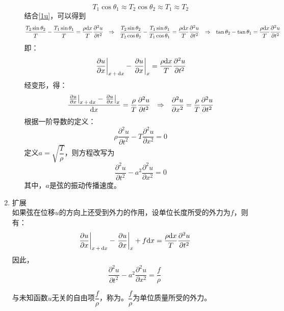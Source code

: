 \begin{enumerate}[\hspace*{3em} 1.]
\begin{enumerate}[]
\begin{equation}
			T_1\cos\theta_1\approx T_2 \cos \theta_2 \approx T_1 \approx T_2
		\end{equation}
		结合\eqref{1u}，可以得到
		\[
		\frac{T_2 \sin \theta_2}{T} - \frac{T_1 \sin\theta_1}{T} = \frac{\rho {\rm{d}} x}{T} \frac{\partial^2 u}{\partial t^2}
		\,\,\,\, \Rightarrow
		\,\,\,\,
		\frac{T_2 \sin \theta_2}{T_2 \cos\theta_2} - \frac{T_1 \sin\theta_1}{T_1\cos\theta_1} = \frac{\rho {\rm{d}} x}{T} \frac{\partial^2 u}{\partial t^2} 
		\,\,\,\, \Rightarrow
		\,\,\,\,
		\tan\theta_2 - \tan\theta_1 = \frac{\rho {\rm{d}} x}{T} \frac{\partial^2 u}{\partial t^2} 
		\]
		即：
		\begin{equation}
			\left. \frac{\partial u}{\partial x}\right|_{x \,+\, {\rm{d}} x} - \left. \frac{\partial u}{\partial x}\right|_{x} = \frac{\rho {\rm{d}} x}{T} \frac{\partial^2 u}{\partial t^2} 
		\end{equation}
	经变形，得：
	\[
	\frac{\left. \frac{\partial u}{\partial x}\right|_{x \,+\, {\rm{d}} x} - \left. \frac{\partial u}{\partial x}\right|_{x}}{{\rm{d}} x}=\frac{\rho}{T}\frac{\partial^2 u}{\partial t^2} \,\,\,\, \Rightarrow
	\,\,\,\,
	\frac{\partial^2 u}{\partial x^2}=\frac{\rho}{T}\frac{\partial^2 u}{\partial t^2} 
	\]
	根据一阶导数的定义：
	\begin{equation}
		\rho \frac{\partial^2 u}{\partial t^2}  - T \frac{\partial^2 u}{\partial x^2} = 0
	\end{equation}
	定义$a = \sqrt{\dfrac{T}{\rho}}$，则方程改写为
	\begin{equation}
		\frac{\partial^2 u}{\partial t^2}  - a^2 \frac{\partial^2 u}{\partial x^2} = 0
	\end{equation}
	其中，$a$是弦的振动传播速度。
	\end{enumerate}
\item 扩展\\
如果弦在位移$u$的方向上还受到外力的作用，设单位长度所受的外力为$f$，则有：
\begin{equation}
	\left. \frac{\partial u}{\partial x}\right|_{x \,+\, {\rm{d}} x} - \left. \frac{\partial u}{\partial x}\right|_{x} + f {\rm{d}} x= \frac{\rho {\rm{d}} x}{T} \frac{\partial^2 u}{\partial t^2} 
\end{equation}
因此，
\begin{equation}
	\frac{\partial^2 u}{\partial t^2}  - a^2 \frac{\partial^2 u}{\partial x^2} = \frac{f}{\rho}
\end{equation}

与未知函数$u$无关的自由项$\dfrac{f}{\rho}$，称为。$\dfrac{f}{\rho}$为单位质量所受的外力。
\end{enumerate}


